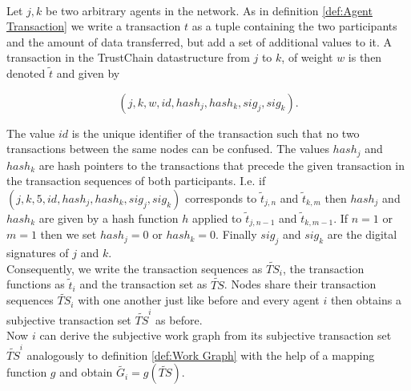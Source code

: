 \begin{definition}[TrustChain]\ \\
\label{def:TrustChain}
\noindent{}Let $j,k$ be two arbitrary agents in the network. As in definition \ref{def:Agent Transaction} we write a transaction $t$ as a tuple containing the two participants and the amount of data transferred, but add a set of additional values to it. A transaction in the TrustChain datastructure from $j$ to $k$, of weight $w$ is then denoted $\tilde{t}$ and given by 

\[
(j,k,w,id,hash_j,hash_k,sig_j,sig_k).
\]

\noindent{}The value $id$ is the unique identifier of the transaction such that no two transactions between the same nodes can be confused. The values $hash_j$ and $hash_k$ are hash pointers to the transactions that precede the given transaction in the transaction sequences of both participants. I.e. if $(j,k,5,id,hash_j,hash_k,sig_j,sig_k)$ corresponds to $\tilde{t}_{j,n}$ and $\tilde{t}_{k,m}$ then $hash_j$ and $hash_k$ are given by a hash function $h$ applied to $\tilde{t}_{j,n-1}$ and $\tilde{t}_{k,m-1}$. If $n=1$ or $m=1$ then we set $hash_j=0$ or $hash_k=0$. Finally $sig_j$ and $sig_k$ are the digital signatures of $j$ and $k$. \vspace{1em}\\

\noindent{}Consequently, we write the transaction sequences as $\tilde{TS}_i$, the transaction functions as $\tilde{t}_i$ and the transaction set as $\tilde{TS}$. Nodes share their transaction sequences $\tilde{TS}_i$ with one another just like before and every agent $i$ then obtains a subjective transaction set $\tilde{TS}^i$ as before. \vspace{1em}\\ 

\noindent{}Now $i$ can derive the subjective work graph from its subjective transaction set $\tilde{TS}^i$ analogously to definition \ref{def:Work Graph} with the help of a mapping function $g$ and obtain $\tilde{G_i}=g(\tilde{TS})$. \vspace{1em}\\ 
\end{definition} 


